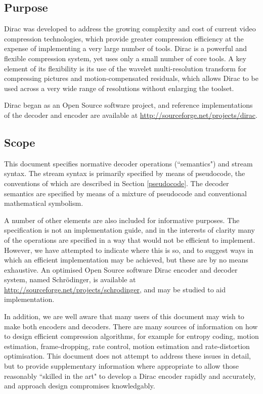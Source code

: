 \subsection{Purpose}
\label{intropurpose}
Dirac was developed to address the growing complexity and cost of current video
compression technologies, which provide greater compression efficiency
at the expense of implementing a very large number of tools. Dirac is
a powerful and flexible compression system, yet uses only a small number
of core tools. A key element of its flexibility is its use of the wavelet
multi-resolution transform for compressing pictures and motion-compensated 
residuals, which allows Dirac to be used across a very wide range of resolutions
without enlarging the toolset.

Dirac began as an Open Source software project, and reference implementations
of the decoder and encoder are available at \underline{http://sourceforge.net/projects/dirac}.

\subsection{Scope}
\label{introscope}

This document specifies normative decoder operations (``semantics") and 
stream syntax. The stream syntax is primarily specified by means of
pseudocode, the conventions of which are described in Section \ref{pseudocode}.
The decoder semantics are specified by means of a mixture of pseudocode
and conventional mathematical symbolism.

A number of other elements are also included for informative purposes.
The specification is not an implementation guide, and in the interests
of clarity many of the operations are specified in a way that would not be 
efficient to implement. However, we have attempted
to indicate where this is so, and to suggest ways in which an efficient implementation
may be achieved, but these are by no means exhaustive. An optimised Open Source
software Dirac encoder and decoder system, named Schr\"odinger, is available at
\underline{http://sourceforge.net/projects/schrodinger}, and may be studied to aid implementation.

In addition, we are well aware that many users of this document may wish
to make both encoders and decoders. There are many sources of information
on how to design efficient compression algorithms, for example for entropy coding,
motion estimation, frame-dropping, rate control, motion estimation and 
rate-distortion optimisation. This document does not attempt to address these
issues in detail, but to provide supplementary information where appropriate
to allow those reasonably ``skilled in the art" to develop a Dirac encoder
rapidly and accurately, and approach design compromises knowledgably.

